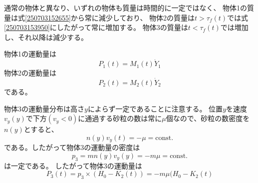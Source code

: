 \documentclass[]{article}
\begin{document}
通常の物体と異なり、いずれの物体も質量は時間的に一定ではなく、
物体1の質量は式\eqref{250703152655}から常に減少しており、
物体2の質量は$t>\tau_f(t)$では式\eqref{250703153950}にしたがって常に増加する。
物体3の質量は$t<\tau_f(t)$では増加し、それ以降は減少する。


物体1の運動量は
\begin{equation} \label{250917102959} 
   P_1(t)  = M_1(t) \dot{Y}_1 
\end{equation}
物体2の運動量は
\begin{equation} \label{250917103019} 
   P_2(t) = M_2(t)\dot{Y}_2  
\end{equation}
である。



物体3の運動量分布は高さ$y$によらず一定であることに注意する。
位置$y$を速度$v_y(y)$で下方$(v_y<0)$に通過する砂粒の数は常に$\mu$個なので、砂粒の数密度を$n(y)$とすると、
\begin{equation} \label{250917101402} 
   n(y) v_y(t) = -\mu = \text{const.}
\end{equation}
である。したがって物体3の運動量の密度は
\begin{equation} \label{250917102631} 
   p_3 = mn(y)v_y(y)= -m \mu = \text{const.}
\end{equation}
は一定である。
したがって物体3の運動量は
\begin{equation} \label{250917102719} 
   P_3(t) = p_3 \times (H_0 - K_2(t)) = -m\mu(H_0-K_2(t)
\end{equation}



%
%
%
\end{document}
